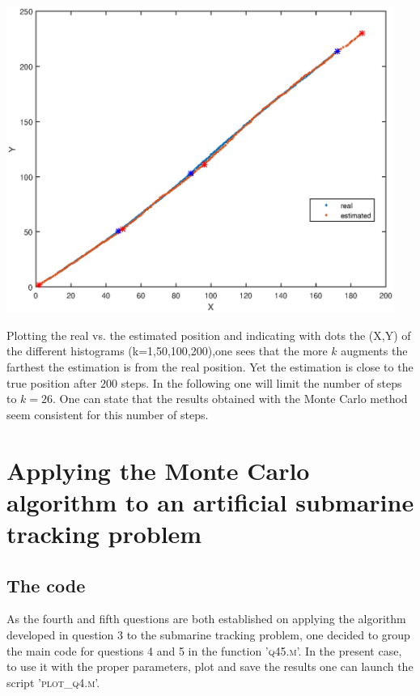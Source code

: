 \documentclass[english,DIV=13]{scrartcl}
\begin{document}
\begin{center}
	\begin{minipage}{.6\textwidth}
		\includegraphics[width=0.95\textwidth]{img/q3_path.eps}
	\end{minipage}%
	\begin{minipage}{.4\textwidth}
		Plotting the real vs. the estimated position and indicating with dots the (X,Y) of the 
		different histograms (k=1,50,100,200),one sees that the more $k$ augments
		the farthest the estimation is from the real position. Yet the estimation is close
		to the true position after $200$ steps. In the following one will limit the number
		of steps to $k=26$. One can state that the results obtained with the Monte
		Carlo method seem consistent for this number of steps.
	\end{minipage}
\end{center}
  
\section{Applying the Monte Carlo algorithm to an artificial submarine 
tracking problem}
\subsection*{The code}
As the fourth and fifth questions are both established on applying the algorithm developed in question
3 to the submarine tracking problem, one decided to group the main code for questions 4 and 5
in the function '\textsc{q45.m}'. In the present case, to use it with the proper parameters, plot
and save the results one can launch the script '\textsc{plot\_q4.m}'.\\
\end{document}
